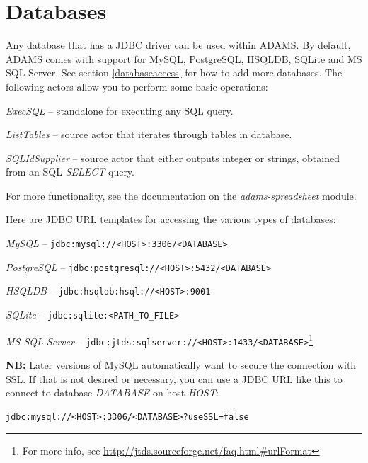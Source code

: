 \newpage
\section{Databases}
Any database that has a JDBC driver can be used within ADAMS. By default,
ADAMS comes with support for MySQL, PostgreSQL, HSQLDB, SQLite and MS SQL Server.
See section \ref{databaseaccess} for how to add more databases. The following
actors allow you to perform some basic operations:
\begin{tight_itemize}
	\item \textit{ExecSQL} -- standalone for executing any SQL query.
	\item \textit{ListTables} -- source actor that iterates through tables
	in database.
	\item \textit{SQLIdSupplier} -- source actor that either outputs integer
	or strings, obtained from an SQL \textit{SELECT} query.
\end{tight_itemize}
For more functionality, see the documentation on the \textit{adams-spreadsheet} 
module.

\noindent Here are JDBC URL templates for accessing the various types of databases:
\begin{tight_itemize}
  \item \textit{MySQL} -- \texttt{jdbc:mysql://<HOST>:3306/<DATABASE>}
  \item \textit{PostgreSQL} -- \texttt{jdbc:postgresql://<HOST>:5432/<DATABASE>}
  \item \textit{HSQLDB} -- \texttt{jdbc:hsqldb:hsql://<HOST>:9001}
  \item \textit{SQLite} -- \texttt{jdbc:sqlite:<PATH\_TO\_FILE>}
  \item \textit{MS SQL Server} -- \texttt{jdbc:jtds:sqlserver://<HOST>:1433/<DATABASE>}\footnote{
  For more info, see \url{http://jtds.sourceforge.net/faq.html\#urlFormat}{}}
\end{tight_itemize}

\noindent \textbf{NB:} Later versions of MySQL automatically want to secure
the connection with SSL. If that is not desired or necessary, you can use
a JDBC URL like this to connect to database \textit{DATABASE} on host \textit{HOST}:
\begin{verbatim}
jdbc:mysql://<HOST>:3306/<DATABASE>?useSSL=false
\end{verbatim}


\newpage
